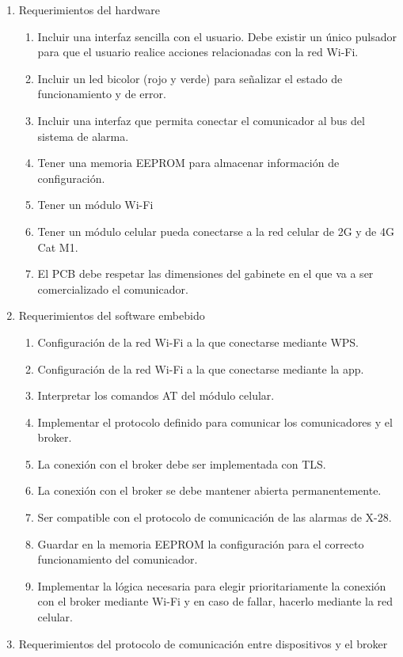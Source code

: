 \documentclass[
11pt, %
codirector, %
]{charter}
\begin{document}
\begin{enumerate}
	\item Requerimientos del hardware
		\begin{enumerate}
			\item Incluir una interfaz sencilla con el usuario. Debe existir un único pulsador para que el usuario realice acciones relacionadas con la red Wi-Fi.
			\item Incluir un led bicolor (rojo y verde) para señalizar el estado de funcionamiento y de error.
			\item Incluir una interfaz que permita conectar el comunicador al bus del sistema de alarma.
			\item Tener una memoria EEPROM para almacenar información de configuración.
			\item Tener un módulo Wi-Fi
			\item Tener un módulo celular pueda conectarse a la red celular de 2G y de 4G Cat M1.
			\item El PCB debe respetar las dimensiones del gabinete en el que va a ser comercializado el comunicador.
		\end{enumerate}
	\item Requerimientos del software embebido
		\begin{enumerate}
			\item Configuración de la red Wi-Fi a la que conectarse mediante WPS.
			\item Configuración de la red Wi-Fi a la que conectarse mediante la app.
			\item Interpretar los comandos AT del módulo celular.
			\item Implementar el protocolo definido para comunicar los comunicadores y el broker.
			\item La conexión con el broker debe ser implementada con TLS.
			\item La conexión con el broker se debe mantener abierta permanentemente.
			\item Ser compatible con el protocolo de comunicación de las alarmas de X-28.
			\item Guardar en la memoria EEPROM la configuración para el correcto funcionamiento del comunicador.
			\item Implementar la lógica necesaria para elegir prioritariamente la conexión con el broker mediante Wi-Fi y en caso de fallar, hacerlo mediante la red celular.
		\end{enumerate}
	\item Requerimientos del protocolo de comunicación entre dispositivos y el broker

\end{enumerate}
\end{document}

